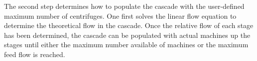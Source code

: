 \documentclass{anstrans}
\begin{document}
The second step determines how to populate the cascade with the user-defined
maximum number of centrifuges. One first solves the linear flow equation to
determine the theoretical flow in the cascade.
Once the relative flow of each stage has been determined, the
cascade can be populated with actual machines up the stages
until either the maximum number available of machines or the maximum feed
flow is reached.
\end{document}
